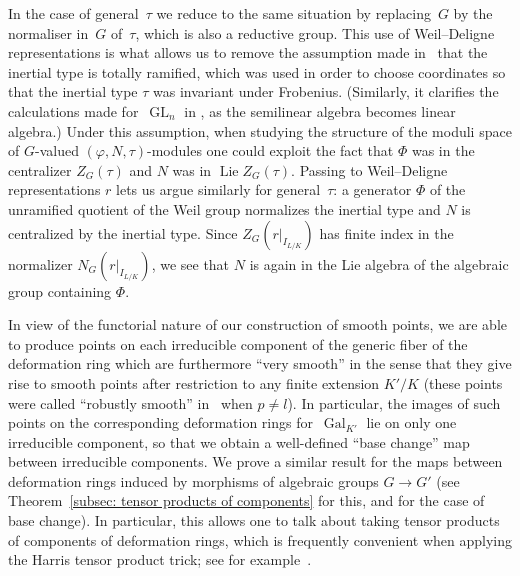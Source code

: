 \documentclass{amsart}
\DeclareMathOperator{\Lie}{Lie}
\theoremstyle{definition}
\theoremstyle{remark}
\DeclareMathOperator{\Gal}{Gal}
\DeclareMathOperator{\GL}{GL}
\begin{document}
In the case of general~$\tau$ we reduce to the same situation by
replacing~$G$ by the normaliser in~$G$ of~$\tau$, which is also a
reductive group. This use of Weil--Deligne representations is what
allows us to remove the assumption made in~\cite{2014arXiv1403.1411B}
that the inertial type is totally ramified, which was used in order to
choose coordinates so that the inertial type $\tau$ was invariant
under %
Frobenius. (Similarly, it clarifies the calculations made
for~$\GL_n$ in \cite{MR2373358}, as the semilinear algebra becomes
linear algebra.) Under this assumption, when studying the structure of
the moduli space of $G$-valued $(\varphi,N,\tau)$-modules one could
exploit the fact that $\Phi$ was in the centralizer $Z_G(\tau)$ and
$N$ was in $\Lie Z_G(\tau)$.  Passing to Weil--Deligne representations
$r$ lets us argue similarly for general~$\tau$: a generator $\Phi$ of
the unramified quotient of the Weil group normalizes the inertial type
and $N$ is centralized by the inertial type.  Since
$Z_G(r|_{I_{L/K}})$ has finite index in the normalizer
$N_G(r|_{I_{L/K}})$, we see that $N$ is again in the Lie algebra of
the algebraic group containing $\Phi$.

In view of the functorial nature of our construction of smooth points,
we are able to produce points on each irreducible component of the
generic fiber of the deformation ring which are furthermore ``very
smooth'' in the sense that they give rise to smooth points after
restriction to any finite extension $K'/K$ (these points were called
``robustly smooth'' in~\cite{BLGGT} when $p\ne l$). In particular, the
images of such points on the corresponding deformation rings
for~$\Gal_{K'}$ lie on only one irreducible component, so that we obtain
a well-defined ``base change'' map between irreducible components. We
prove a similar result for the maps between deformation rings induced
by morphisms of algebraic groups $G\to G'$ (see Theorem~\ref{subsec:
  tensor products of components} for this, and for the case of base
change). In particular, this allows one to talk about taking tensor
products of components of deformation rings, which is frequently
convenient when applying the Harris tensor product trick; see for
example~\cite{CEGglobalrealisable}.
\end{document}
